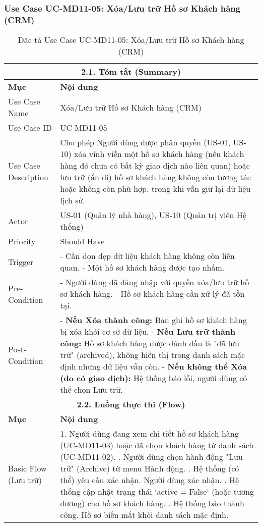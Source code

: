 \subsubsection{Use Case UC-MD11-05: Xóa/Lưu trữ Hồ sơ Khách hàng (CRM)}
\begin{longtable}{|m{4cm}|p{11cm}|}
\caption{Đặc tả Use Case UC-MD11-05: Xóa/Lưu trữ Hồ sơ Khách hàng (CRM)} \label{tab:uc_md11_05_delete_archive_customer_crm} \\
\hline
\multicolumn{2}{|c|}{\textbf{2.1. Tóm tắt (Summary)}} \\
\hline
\textbf{Mục} & \textbf{Nội dung} \\
\hline
\endhead
\midrule
\endfoot
\bottomrule
\endlastfoot
Use Case Name & Xóa/Lưu trữ Hồ sơ Khách hàng (CRM) \\
\hline
Use Case ID & UC-MD11-05 \\
\hline
Use Case Description & Cho phép Người dùng được phân quyền (US-01, US-10) xóa vĩnh viễn một hồ sơ khách hàng (nếu khách hàng đó chưa có bất kỳ giao dịch nào liên quan) hoặc lưu trữ (ẩn đi) hồ sơ khách hàng không còn tương tác hoặc không còn phù hợp, trong khi vẫn giữ lại dữ liệu lịch sử. \\
\hline
Actor & US-01 (Quản lý nhà hàng), US-10 (Quản trị viên Hệ thống) \\
\hline
Priority & Should Have \\
\hline
Trigger & - Cần dọn dẹp dữ liệu khách hàng không còn liên quan. \newline - Một hồ sơ khách hàng được tạo nhầm. \\
\hline
Pre-Condition & - Người dùng đã đăng nhập với quyền xóa/lưu trữ hồ sơ khách hàng. \newline - Hồ sơ khách hàng cần xử lý đã tồn tại. \\
\hline
Post-Condition & - \textbf{Nếu Xóa thành công:} Bản ghi hồ sơ khách hàng bị xóa khỏi cơ sở dữ liệu. \newline - \textbf{Nếu Lưu trữ thành công:} Hồ sơ khách hàng được đánh dấu là "đã lưu trữ" (archived), không hiển thị trong danh sách mặc định nhưng dữ liệu vẫn còn. \newline - \textbf{Nếu không thể Xóa (do có giao dịch):} Hệ thống báo lỗi, người dùng có thể chọn Lưu trữ. \\
\hline
\multicolumn{2}{|c|}{\textbf{2.2. Luồng thực thi (Flow)}} \\
\hline
\textbf{Mục} & \textbf{Nội dung} \\
\hline
Basic Flow (Lưu trữ) & 1. Người dùng đang xem chi tiết hồ sơ khách hàng (UC-MD11-03) hoặc đã chọn khách hàng từ danh sách (UC-MD11-02). \newline 2. Người dùng chọn hành động "Lưu trữ" (Archive) từ menu Hành động. \newline 3. Hệ thống (có thể) yêu cầu xác nhận. Người dùng xác nhận. \newline 4. Hệ thống cập nhật trạng thái `active = False` (hoặc tương đương) cho hồ sơ khách hàng. \newline 5. Hệ thống báo thành công. Hồ sơ biến mất khỏi danh sách mặc định. \\

\end{longtable}
